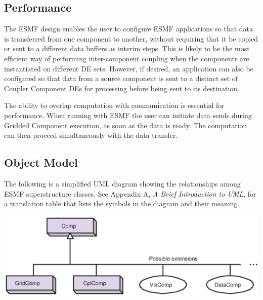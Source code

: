 \subsection{Performance}
\label{sec:performance}

The ESMF design enables the user to configure ESMF
applications so that data is transferred from one component to another, 
without requiring that it be copied or sent to a different data
buffers as interim steps.  This is likely to be the most efficient way 
of performing inter-component coupling when the components are instantiated 
on different DE sets.  However, if desired, an application can also be 
configured so that data from a source component is sent to a distinct set of 
Coupler Component DEs for processing before being sent to its 
destination.

The ability to overlap computation with communication is essential for
performance.  When running with ESMF the user can initiate data 
sends during Gridded Component execution, as soon as the data is ready.
The computation can then proceed simultaneously with the data transfer.

\newpage
\subsection{Object Model}

The following is a simplified UML diagram showing the relationships among
ESMF superstructure classes.  See Appendix A, {\it A Brief 
Introduction to UML},
for a translation table that lists the symbols in the diagram and their 
meaning.

\begin{center}
\includegraphics{Comp_obj.eps}   
\end{center}



